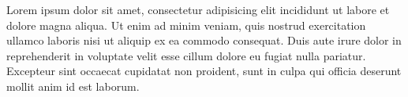 \documentclass[a4paper,12pt]{article}
\newcommand{\lowercaseheight}{1ex}
\newcommand{\uppercaseheight}{1.7ex}
\newcommand{\descenderdeptha}{-1ex}
\newcommand{\descenderdepthb}{-1.7ex}
\newcommand{\descenderdepthc}{-2.7ex}
\newenvironment{drillsheet}{%
    \setlength\linenumbersep{0pt}%
    \renewcommand{\thelinenumber}{%
        \begin{tikzpicture}[overlay]
                \color{black!25}%
                \draw ((0,0) -- ++(\textwidth,0);
                \draw [ultra thin] ((0,\lowercaseheight) -- ++(\textwidth,0);
                \draw (0,\uppercaseheight) -- ++(\textwidth,0);
                \draw [ultra thin] (0,\descenderdeptha) -- ++(\textwidth,0);
                \draw [ultra thin] (0,\descenderdepthb) -- ++(\textwidth,0);
                \draw [ultra thin] (0,\descenderdepthc) -- ++(\textwidth,0);
        \end{tikzpicture}%
    }%
    \renewcommand\linenumberfont{\normalfont\color{black}}
    \begin{linenumbers}%
        \color{black}%
}{
    \end{linenumbers}%
}
\begin{document}
\Large
\begin{drillsheet}
    Lorem ipsum dolor sit amet, consectetur adipisicing elit
    incididunt ut labore et dolore magna aliqua. Ut enim ad minim veniam, quis
    nostrud exercitation ullamco laboris nisi ut aliquip ex ea commodo consequat.
    Duis aute irure dolor in reprehenderit in voluptate velit esse cillum dolore eu
    fugiat nulla pariatur. Excepteur sint occaecat cupidatat non proident, sunt in
    culpa qui officia deserunt mollit anim id est laborum.
\end{drillsheet}
\end{document}
